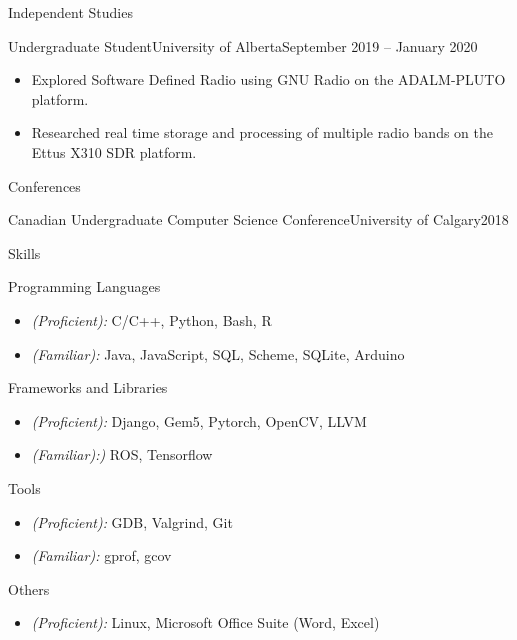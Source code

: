 \documentclass[]{mcdowellcv}
\begin{document}
\vspace*{-10pt}
\begin{cvsection}{Independent Studies}
  \begin{cvsubsection}{Undergraduate Student}{University of Alberta}{September 2019 -- January 2020}
    \begin{itemize}
      \item Explored Software Defined Radio using GNU Radio on the ADALM-PLUTO platform.
      \item Researched real time storage and processing of multiple radio bands on the Ettus X310 SDR platform.
    \end{itemize}
  \end{cvsubsection}
\end{cvsection}

\vspace*{-10pt}
\begin{cvsection}{Conferences}
  \begin{cvsubsection}{Canadian Undergraduate Computer Science Conference}{University of Calgary}{2018}
  \end{cvsubsection}
\end{cvsection}

\vspace*{-10pt}
\begin{cvsection}{Skills}
  \begin{cvsubsection}{Programming Languages}{}{}	
    \begin{itemize}
      \item \emph{(Proficient):} C/C++, Python, Bash, R  
      \item \emph{(Familiar):} Java, JavaScript, SQL, Scheme, SQLite, Arduino
    \end{itemize}
  \end{cvsubsection}
  \begin{cvsubsection}{Frameworks and Libraries}{}{}
    \begin{itemize}
      \item \emph{(Proficient):} Django, Gem5, Pytorch, OpenCV, LLVM
      \item \emph{(Familiar):)} ROS, Tensorflow
    \end{itemize}
  \end{cvsubsection}
  \begin{cvsubsection}{Tools}{}{}
    \begin{itemize}
      \item \emph{(Proficient):} GDB, Valgrind, Git 
      \item \emph{(Familiar):} gprof, gcov
    \end{itemize}
  \end{cvsubsection}
  \begin{cvsubsection}{Others}{}{}
    \begin{itemize}
    \item \emph{(Proficient):} Linux, Microsoft Office Suite (Word, Excel)
    \end{itemize}
  \end{cvsubsection}
\end{cvsection}
\end{document}
